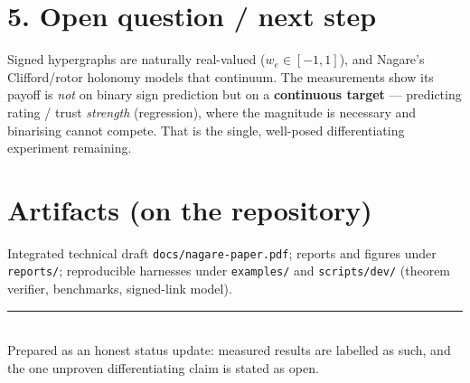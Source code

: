 \documentclass[11pt]{article}
\begin{document}
\section*{5. Open question / next step}
Signed hypergraphs are naturally real-valued ($w_e\in[-1,1]$), and Nagare's
Clifford/rotor holonomy models that continuum. The measurements show its payoff is
\emph{not} on binary sign prediction but on a \textbf{continuous target} ---
predicting rating / trust \emph{strength} (regression), where the magnitude is
necessary and binarising cannot compete. That is the single, well-posed
differentiating experiment remaining.

\section*{Artifacts (on the repository)}
Integrated technical draft \texttt{docs/nagare-paper.pdf}; reports and figures
under \texttt{reports/}; reproducible harnesses under \texttt{examples/} and
\texttt{scripts/dev/} (theorem verifier, benchmarks, signed-link model).

\vspace{4pt}\textcolor{nb}{\rule{\textwidth}{0.4pt}}\\
\footnotesize Prepared as an honest status update: measured results are labelled
as such, and the one unproven differentiating claim is stated as open.
\end{document}
